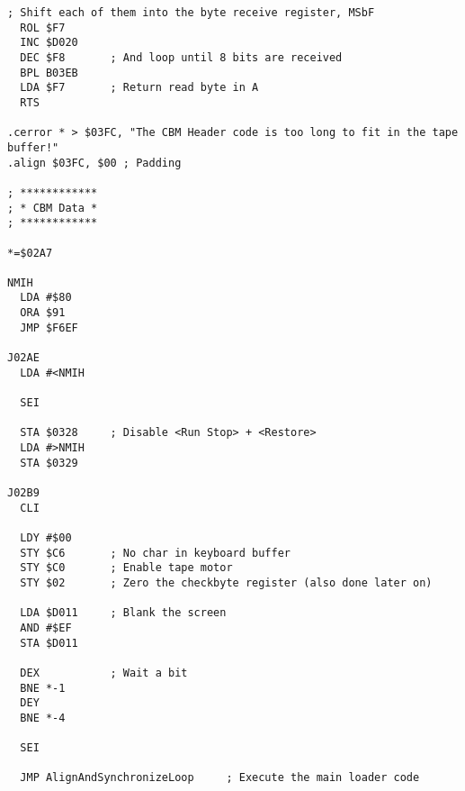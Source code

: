 \begin{minipage}[b]{0.50\linewidth}
\centering
\begin{lstlisting}[basicstyle=\tiny\ttfamily]
  ; Shift each of them into the byte receive register, MSbF
  ROL $F7       
  INC $D020     
  DEC $F8       ; And loop until 8 bits are received
  BPL B03EB     
  LDA $F7       ; Return read byte in A
  RTS           

.cerror * > $03FC, "The CBM Header code is too long to fit in the tape buffer!"
.align $03FC, $00 ; Padding

; ************
; * CBM Data *
; ************

*=$02A7

NMIH
  LDA #$80      
  ORA $91       
  JMP $F6EF     

J02AE
  LDA #<NMIH    

  SEI           

  STA $0328     ; Disable <Run Stop> + <Restore>
  LDA #>NMIH    
  STA $0329     

J02B9
  CLI           

  LDY #$00      
  STY $C6       ; No char in keyboard buffer
  STY $C0       ; Enable tape motor
  STY $02       ; Zero the checkbyte register (also done later on)

  LDA $D011     ; Blank the screen
  AND #$EF      
  STA $D011     

  DEX           ; Wait a bit
  BNE *-1       
  DEY           
  BNE *-4       

  SEI           

  JMP AlignAndSynchronizeLoop     ; Execute the main loader code
\end{lstlisting}
\end{minipage}
\hspace{0.5cm}
